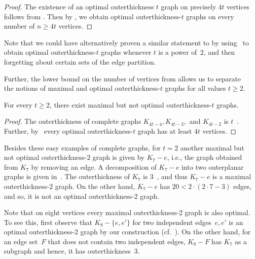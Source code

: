 \documentclass[unicode,runningheads,envcountsame,a4paper,dvipsnames,12pt]{llncs}
\begin{document}
	\begin{proof}
		The existence of an optimal outerthickness \(t\) graph on precisely \(4t\) vertices follows from . Then by , we obtain optimal outerthickness-\(t\) graphs on every number of \(n \geq 4t\) vertices.
	\end{proof}
	
	Note that we could have alternatively proven a similar statement to  by using~ to obtain optimal outerthickness-\(t\) graphs whenever \(t\) is a power of~$2$, and then forgetting about certain sets of the edge partition. 
	
	Further, the lower bound on the number of vertices from  allows us to separate the notions of maximal and optimal outerthickness-\(t\) graphs for all values \(t \geq 2\).
	
	\begin{corollary}
		\label{cor:max-not-opt}
		For every \(t \geq 2\), there exist maximal but not optimal outerthick\-ness-\(t\) graphs.
	\end{corollary}
	
	\begin{proof}
		The outerthickness of complete graphs \(K_{4t-4},K_{4t-3},\) and \(K_{4t-2}\) is \(t\)~\cite{Guy1990}. Further, by~ every optimal outerthick\-ness-\(t\) graph has at least \(4t\) vertices.
	\end{proof}
	
	Besides these easy examples of complete graphs, for \(t=2\) another maximal but not optimal outerthick\-ness-\(2\) graph is given by \(K_7-e\), i.e., the graph obtained from $K_{7}$ by removing an edge.
	A decomposition of \(K_7-e\) into two outerplanar graphs is given in~.
	The outerthickness of \(K_7\) is $3$~\cite{Guy1990}, and thus $K_{7}-e$ is a maximal outerthick\-ness-\(2\) graph.
	On the other hand, \(K_7-e\) has \(20 < 2 \cdot (2 \cdot 7 - 3)\) edges, and so, it is not an optimal outerthick\-ness-\(2\) graph.
	
	Note that on eight vertices every maximal outerthickness-2 graph is also optimal.
	To see this, first observe that \(K_8-\{e,e'\}\) for two independent edges~\(e,e'\) is an optimal outerthick\-\mbox{ness-2} graph by our construction (cf.~).
	On the other hand, for an edge set~$F$ that does not contain two independent edges, \(K_8-F\) has \(K_7\) as a subgraph and hence, it has outerthickness~3.
	
\end{document}
